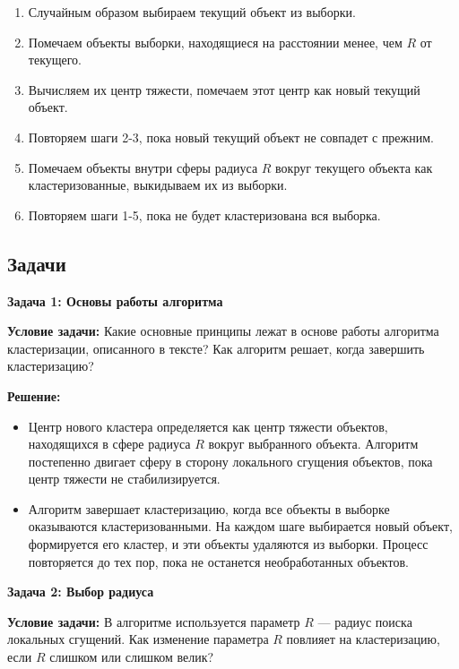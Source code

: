 \begin{enumerate}
    \item Случайным образом выбираем текущий объект из выборки.
    \item Помечаем объекты выборки, находящиеся на расстоянии менее, чем \( R \) от текущего.
    \item Вычисляем их центр тяжести, помечаем этот центр как новый текущий объект.
    \item Повторяем шаги 2-3, пока новый текущий объект не совпадет с прежним.
    \item Помечаем объекты внутри сферы радиуса \( R \) вокруг текущего объекта как кластеризованные, выкидываем их из выборки.
    \item Повторяем шаги 1-5, пока не будет кластеризована вся выборка.
\end{enumerate}

\subsection{Задачи}

\textbf{Задача 1: Основы работы алгоритма}

\textbf{Условие задачи:}
Какие основные принципы лежат в основе работы алгоритма кластеризации, описанного в тексте? Как алгоритм решает, когда завершить кластеризацию?

\textbf{Решение:}
\begin{itemize}
    \item Центр нового кластера определяется как центр тяжести объектов, находящихся в сфере радиуса \( R \) вокруг выбранного объекта. Алгоритм постепенно двигает сферу в сторону локального сгущения объектов, пока центр тяжести не стабилизируется.
    \item Алгоритм завершает кластеризацию, когда все объекты в выборке оказываются кластеризованными. На каждом шаге выбирается новый объект, формируется его кластер, и эти объекты удаляются из выборки. Процесс повторяется до тех пор, пока не останется необработанных объектов.
\end{itemize}

\vspace{1em}

\textbf{Задача 2: Выбор радиуса}

\textbf{Условие задачи:}
В алгоритме используется параметр \( R \) — радиус поиска локальных сгущений. Как изменение параметра \( R \) повлияет на кластеризацию, если \( R \) слишком или слишком велик?

